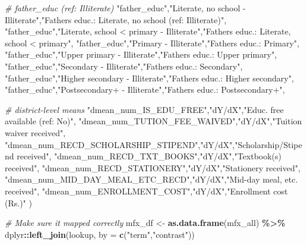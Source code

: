 \documentclass[
]{article}
\newenvironment{Shaded}{\begin{snugshade}}{\end{snugshade}}
\newcommand{\AttributeTok}[1]{\textcolor[rgb]{0.13,0.29,0.53}{#1}}
\newcommand{\CommentTok}[1]{\textcolor[rgb]{0.56,0.35,0.01}{\textit{#1}}}
\newcommand{\FunctionTok}[1]{\textcolor[rgb]{0.13,0.29,0.53}{\textbf{#1}}}
\newcommand{\NormalTok}[1]{#1}
\newcommand{\OtherTok}[1]{\textcolor[rgb]{0.56,0.35,0.01}{#1}}
\newcommand{\SpecialCharTok}[1]{\textcolor[rgb]{0.81,0.36,0.00}{\textbf{#1}}}
\newcommand{\StringTok}[1]{\textcolor[rgb]{0.31,0.60,0.02}{#1}}
\begin{document}
\begin{Shaded}
\begin{Highlighting}[]
  \CommentTok{\# father\_educ (ref: Illiterate)}
  \StringTok{"father\_educ"}\NormalTok{,}\StringTok{"Literate, no school {-} Illiterate"}\NormalTok{,}\StringTok{"Father\textquotesingle{}s educ.: Literate, no school (ref: Illiterate)"}\NormalTok{,}
  \StringTok{"father\_educ"}\NormalTok{,}\StringTok{"Literate, school \textless{} primary {-} Illiterate"}\NormalTok{,}\StringTok{"Father\textquotesingle{}s educ.: Literate, school \textless{} primary"}\NormalTok{,}
  \StringTok{"father\_educ"}\NormalTok{,}\StringTok{"Primary {-} Illiterate"}\NormalTok{,}\StringTok{"Father\textquotesingle{}s educ.: Primary"}\NormalTok{,}
  \StringTok{"father\_educ"}\NormalTok{,}\StringTok{"Upper primary {-} Illiterate"}\NormalTok{,}\StringTok{"Father\textquotesingle{}s educ.: Upper primary"}\NormalTok{,}
  \StringTok{"father\_educ"}\NormalTok{,}\StringTok{"Secondary {-} Illiterate"}\NormalTok{,}\StringTok{"Father\textquotesingle{}s educ.: Secondary"}\NormalTok{,}
  \StringTok{"father\_educ"}\NormalTok{,}\StringTok{"Higher secondary {-} Illiterate"}\NormalTok{,}\StringTok{"Father\textquotesingle{}s educ.: Higher secondary"}\NormalTok{,}
  \StringTok{"father\_educ"}\NormalTok{,}\StringTok{"Postsecondary+ {-} Illiterate"}\NormalTok{,}\StringTok{"Father\textquotesingle{}s educ.: Postsecondary+"}\NormalTok{,}

  \CommentTok{\# district{-}level means}
  \StringTok{"dmean\_num\_IS\_EDU\_FREE"}\NormalTok{,}\StringTok{"dY/dX"}\NormalTok{,}\StringTok{"Educ. free available (ref: No)"}\NormalTok{,}
  \StringTok{"dmean\_num\_TUTION\_FEE\_WAIVED"}\NormalTok{,}\StringTok{"dY/dX"}\NormalTok{,}\StringTok{"Tuition waiver received"}\NormalTok{,}
  \StringTok{"dmean\_num\_RECD\_SCHOLARSHIP\_STIPEND"}\NormalTok{,}\StringTok{"dY/dX"}\NormalTok{,}\StringTok{"Scholarship/Stipend received"}\NormalTok{,}
  \StringTok{"dmean\_num\_RECD\_TXT\_BOOKS"}\NormalTok{,}\StringTok{"dY/dX"}\NormalTok{,}\StringTok{"Textbook(s) received"}\NormalTok{,}
  \StringTok{"dmean\_num\_RECD\_STATIONERY"}\NormalTok{,}\StringTok{"dY/dX"}\NormalTok{,}\StringTok{"Stationery received"}\NormalTok{,}
  \StringTok{"dmean\_num\_MID\_DAY\_MEAL\_ETC\_RECD"}\NormalTok{,}\StringTok{"dY/dX"}\NormalTok{,}\StringTok{"Mid{-}day meal, etc. received"}\NormalTok{,}
  \StringTok{"dmean\_num\_ENROLLMENT\_COST"}\NormalTok{,}\StringTok{"dY/dX"}\NormalTok{,}\StringTok{"Enrollment cost (Rs.)"}
\NormalTok{)}




\CommentTok{\# Make sure it mapped correctly}
\NormalTok{mfx\_df }\OtherTok{\textless{}{-}} \FunctionTok{as.data.frame}\NormalTok{(mfx\_all) }\SpecialCharTok{\%\textgreater{}\%}
\NormalTok{  dplyr}\SpecialCharTok{::}\FunctionTok{left\_join}\NormalTok{(lookup, }\AttributeTok{by =} \FunctionTok{c}\NormalTok{(}\StringTok{"term"}\NormalTok{,}\StringTok{"contrast"}\NormalTok{))}


\end{Highlighting}
\end{Shaded}
\end{document}
